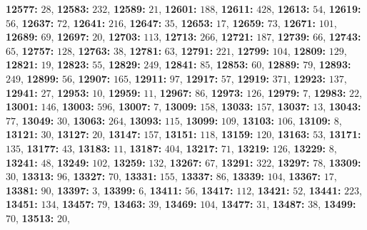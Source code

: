 \textsf{\bfseries 12577:} $28$, \textsf{\bfseries 12583:} $232$, \textsf{\bfseries 12589:} $21$, \textsf{\bfseries 12601:} $188$, \textsf{\bfseries 12611:} $428$, \textsf{\bfseries 12613:} $54$, \textsf{\bfseries 12619:} $56$, \textsf{\bfseries 12637:} $72$, \textsf{\bfseries 12641:} $216$, \textsf{\bfseries 12647:} $35$, \textsf{\bfseries 12653:} $17$, \textsf{\bfseries 12659:} $73$, \textsf{\bfseries 12671:} $101$, \textsf{\bfseries 12689:} $69$, \textsf{\bfseries 12697:} $20$, \textsf{\bfseries 12703:} $113$, \textsf{\bfseries 12713:} $266$, \textsf{\bfseries 12721:} $187$, \textsf{\bfseries 12739:} $66$, \textsf{\bfseries 12743:} $65$, \textsf{\bfseries 12757:} $128$, \textsf{\bfseries 12763:} $38$, \textsf{\bfseries 12781:} $63$, \textsf{\bfseries 12791:} $221$, \textsf{\bfseries 12799:} $104$, \textsf{\bfseries 12809:} $129$, \textsf{\bfseries 12821:} $19$, \textsf{\bfseries 12823:} $55$, \textsf{\bfseries 12829:} $249$, \textsf{\bfseries 12841:} $85$, \textsf{\bfseries 12853:} $60$, \textsf{\bfseries 12889:} $79$, \textsf{\bfseries 12893:} $249$, \textsf{\bfseries 12899:} $56$, \textsf{\bfseries 12907:} $165$, \textsf{\bfseries 12911:} $97$, \textsf{\bfseries 12917:} $57$, \textsf{\bfseries 12919:} $371$, \textsf{\bfseries 12923:} $137$, \textsf{\bfseries 12941:} $27$, \textsf{\bfseries 12953:} $10$, \textsf{\bfseries 12959:} $11$, \textsf{\bfseries 12967:} $86$, \textsf{\bfseries 12973:} $126$, \textsf{\bfseries 12979:} $7$, \textsf{\bfseries 12983:} $22$, \textsf{\bfseries 13001:} $146$, \textsf{\bfseries 13003:} $596$, \textsf{\bfseries 13007:} $7$, \textsf{\bfseries 13009:} $158$, \textsf{\bfseries 13033:} $157$, \textsf{\bfseries 13037:} $13$, \textsf{\bfseries 13043:} $77$, \textsf{\bfseries 13049:} $30$, \textsf{\bfseries 13063:} $264$, \textsf{\bfseries 13093:} $115$, \textsf{\bfseries 13099:} $109$, \textsf{\bfseries 13103:} $106$, \textsf{\bfseries 13109:} $8$, \textsf{\bfseries 13121:} $30$, \textsf{\bfseries 13127:} $20$, \textsf{\bfseries 13147:} $157$, \textsf{\bfseries 13151:} $118$, \textsf{\bfseries 13159:} $120$, \textsf{\bfseries 13163:} $53$, \textsf{\bfseries 13171:} $135$, \textsf{\bfseries 13177:} $43$, \textsf{\bfseries 13183:} $11$, \textsf{\bfseries 13187:} $404$, \textsf{\bfseries 13217:} $71$, \textsf{\bfseries 13219:} $126$, \textsf{\bfseries 13229:} $8$, \textsf{\bfseries 13241:} $48$, \textsf{\bfseries 13249:} $102$, \textsf{\bfseries 13259:} $132$, \textsf{\bfseries 13267:} $67$, \textsf{\bfseries 13291:} $322$, \textsf{\bfseries 13297:} $78$, \textsf{\bfseries 13309:} $30$, \textsf{\bfseries 13313:} $96$, \textsf{\bfseries 13327:} $70$, \textsf{\bfseries 13331:} $155$, \textsf{\bfseries 13337:} $86$, \textsf{\bfseries 13339:} $104$, \textsf{\bfseries 13367:} $17$, \textsf{\bfseries 13381:} $90$, \textsf{\bfseries 13397:} $3$, \textsf{\bfseries 13399:} $6$, \textsf{\bfseries 13411:} $56$, \textsf{\bfseries 13417:} $112$, \textsf{\bfseries 13421:} $52$, \textsf{\bfseries 13441:} $223$, \textsf{\bfseries 13451:} $134$, \textsf{\bfseries 13457:} $79$, \textsf{\bfseries 13463:} $39$, \textsf{\bfseries 13469:} $104$, \textsf{\bfseries 13477:} $31$, \textsf{\bfseries 13487:} $38$, \textsf{\bfseries 13499:} $70$, \textsf{\bfseries 13513:} $20$, 

